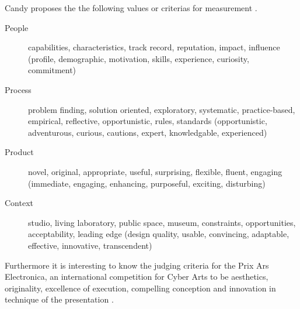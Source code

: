 Candy proposes the the following values or criterias for measurement \autocite{Candy2012}.

\begin{description}
  \item [People] capabilities, characteristics, track record, reputation, impact, influence (profile, demographic, motivation, skills, experience, curiosity, commitment)
  \item [Process] problem finding, solution oriented, exploratory, systematic, practice-based, empirical, reflective, opportunistic, rules, standards (opportunistic, adventurous, curious, cautions, expert, knowledgable, experienced)
  \item [Product] novel, original, appropriate, useful, surprising, flexible, fluent, engaging (immediate, engaging, enhancing, purposeful, exciting, disturbing)
  \item [Context] studio, living laboratory, public space, museum, constraints, opportunities, acceptability, leading edge (design quality, usable, convincing, adaptable, effective, innovative, transcendent)
\end{description}

Furthermore it is interesting to know the judging criteria for the Prix Ars Electronica, an international competition for Cyber Arts to be aesthetics, originality, excellence of execution, compelling conception and innovation in technique of the presentation \autocite[cited in][p.18]{Candy2012}.


\stopcontents[chapters]
